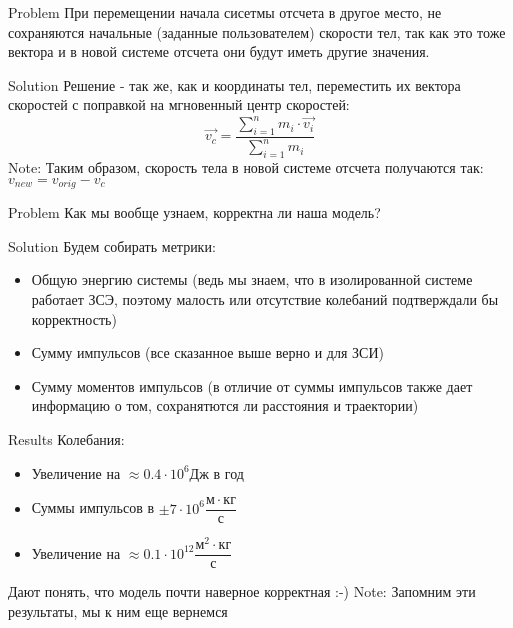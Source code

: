 \documentclass{beamer}
\begin{document}
\begin{frame}[fragile]{Problem}
  При перемещении начала сисетмы отсчета в другое место, не сохраняются начальные (заданные пользователем) скорости тел,
  так как это тоже вектора и в новой системе отсчета они будут иметь другие значения.
\end{frame}

\begin{frame}[fragile]{Solution}
  Решение - так же, как и координаты тел, переместить их вектора скоростей с поправкой на мгновенный центр скоростей:
  \[\overrightarrow{v_c} = \dfrac{\sum_{i = 1}^{n} m_i \cdot \overrightarrow{v_i}}{\sum_{i = 1}^{n} m_i}\]
  Note: Таким образом, скорость тела в новой системе отсчета получаются так: $v_{new} = v_{orig} - v_c$
\end{frame}

\begin{frame}[fragile]{Problem}
  Как мы вообще узнаем, корректна ли наша модель?
\end{frame}

\begin{frame}[fragile]{Solution}
  Будем собирать метрики:
  \begin{itemize}
    \item<1-> Общую энергию системы (ведь мы знаем, что в изолированной системе работает ЗСЭ, поэтому
    малость или отсутствие колебаний подтверждали бы корректность)
    \item<2-> Сумму импульсов (все сказанное выше верно и для ЗСИ)
    \item<3-> Сумму моментов импульсов (в отличие от суммы импульсов также дает информацию о том,
    сохранятются ли расстояния и траектории)
  \end{itemize}
\end{frame}

\begin{frame}[fragile]{Results}
  Колебания:
  \begin{itemize}
    \item<1-> Увеличение на $\approx 0.4 \cdot {10}^6 Дж$ в год
    \item<2-> Суммы импульсов в $\pm 7 \cdot {10}^6 \dfrac{м \cdot кг}{с}$
    \item<3-> Увеличение на $\approx 0.1 \cdot {10}^{12} \dfrac{м^2 \cdot кг}{с}$
  \end{itemize}
  \pause
  \pause
  \pause Дают понять, что модель почти наверное корректная :-)\newline
  \pause Note: Запомним эти результаты, мы к ним еще вернемся
\end{frame}
\end{document}
